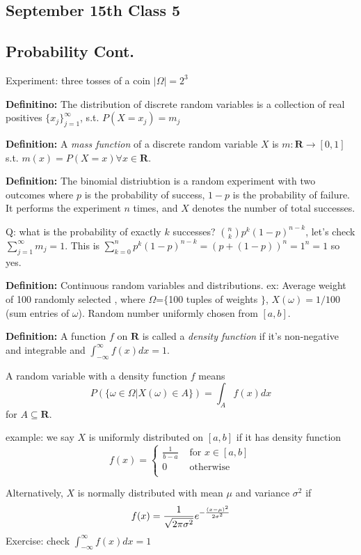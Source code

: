 \begin{enumerate}
\section{September 15th Class 5}
\label{sec:class5}

\subsection{Probability Cont.}
\label{sec:probability}
Experiment: three tosses of a coin $|\Omega|=2^3$

\textbf{Definitino: } The distribution of discrete random variables is
a collection of real positives $\{x_j\}^{\infty}_{j=1}$, s.t.  $P(X=x_j) = m_j$


\textbf{Definition: } A \emph{mass function} of a discrete random
variable $X$ is $m:\mathbf{R}\rightarrow [0, 1]$ s.t. $m(x)=P(X=x)\forall x
\in \mathbf{R}$.

\textbf{Definition:} The binomial distriubtion is a random experiment with two outcomes where
$p$ is the probability of success, $1-p$ is the probability of
failure. It performs the experiment $n$ times, and $X$ denotes the number of total
successes.

Q: what is the probability of exactly $k$ successes? ${n \choose k}
p^k(1-p)^{n-k}$, let's check $\sum_{j=1}^\infty m_j =1$. This is
$\sum_{k=0}^np^k(1-p)^{n-k} = (p + (1-p))^n = 1^n = 1$ so yes.

\textbf{Definition:} Continuous random variables and
distributions. ex: Average weight of 100 randomly selected
, where $\Omega$=$\{$100 tuples of weights $\}$, $X(\omega) =1/100$
(sum entries of $\omega$). Random number uniformly chosen from $[a,b]$.

\textbf{Definition:} A function $f$ on $\mathbf{R}$ is called a
\emph{density function} if it's non-negative and integrable and
$\int_{-\infty}^\infty f(x)dx = 1$.

A random variable with a density function $f$
means $$P(\{ \omega \in \Omega | X(\omega) \in A \}) = \int_Af(x)dx$$
for $A\subseteq \mathbf{R}$.

example: we say $X$ is uniformly distributed on $[a,b]$ if it has
density function 
$$f(x)=
\begin{cases}
  \frac{1}{b-a} & \text{ for } x\in [a,b]\\
  0 & \text{ otherwise }\\
\end{cases}
$$

Alternatively, $X$ is normally distributed with mean $\mu$ and
variance $\sigma^2$ if 
$$f(x) = \frac{1}{\sqrt{2\pi \sigma^2}}e^{-\frac{(x-\mu)^2}{2\sigma^2}}$$
Exercise: check $\int_{-\infty}^{\infty} f(x)dx=1$


\end{enumerate}

